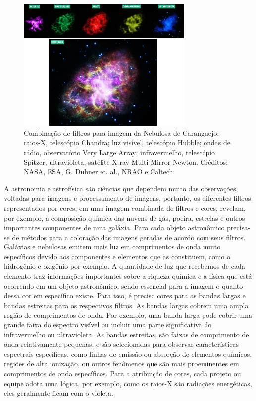 \begin{figure}[h]
  \centering 
  \includegraphics[width=0.77\textwidth]{Imagens/caranguejo_02.png} 
  \caption[Combinação de filtros para imagem da Nebulosa de Caranguejo.]{Combinação de filtros para imagem da Nebulosa de Caranguejo: raios-X, telescópio Chandra; luz visível, telescópio Hubble; ondas de rádio, observatório Very Large Array; infravermelho, telescópio Spitzer; ultravioleta, satélite X-ray Multi-Mirror-Newton. Créditos: NASA, ESA, G. Dubner et. al., NRAO e Caltech.}
  \label{fig:caranguejo} 
\end{figure}

A astronomia e astrofísica são ciências que dependem muito das observações, voltadas para imagens e processamento de imagens, portanto, os diferentes filtros representados por cores, em uma imagem combinada de filtros e cores, revelam, por exemplo, a composição química das nuvens de gás, poeira, estrelas e outros importantes componentes de uma galáxia. Para cada objeto astronômico precisa-se de métodos para a coloração das imagens geradas de acordo com seus filtros. Galáxias e nebulosas emitem mais luz em comprimentos de onda muito específicos devido aos componentes e elementos que as constituem, como o hidrogênio e oxigênio por exemplo. A quantidade de luz que recebemos de cada elemento traz informações importantes sobre a riqueza química e a física que está ocorrendo em um objeto astronômico, sendo essencial para a imagem o quanto dessa cor em específico existe. Para isso, é preciso cores para as bandas largas e bandas estreitas para os respectivos filtros. As bandas largas cobrem uma ampla região de comprimentos de onda. Por exemplo, uma banda larga pode cobrir uma grande faixa do espectro visível ou incluir uma parte significativa do infravermelho ou ultravioleta. As bandas estreitas, são faixas de comprimento de onda relativamente pequenas, e são selecionadas para observar características espectrais específicas, como linhas de emissão ou absorção de elementos químicos, regiões de alta ionização, ou outros fenômenos que são mais proeminentes em comprimentos de onda específicos. Para a atribuição de cores, cada projeto ou equipe adota uma lógica, por exemplo, como os raios-X são radiações energéticas, eles geralmente ficam com o violeta.

